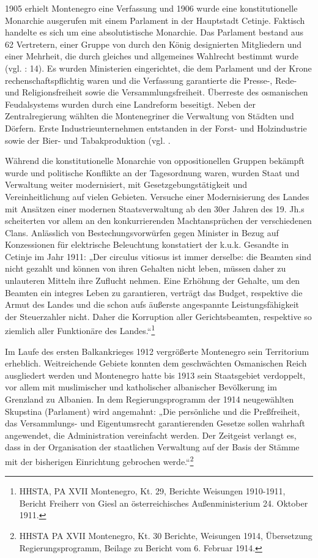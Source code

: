 1905 erhielt Montenegro eine Verfassung und 1906 wurde eine konstitutionelle Monarchie ausgerufen mit einem Parlament in der Hauptstadt Cetinje. Faktisch handelte es sich um eine absolutistische Monarchie. Das Parlament bestand aus 62 Vertretern, einer Gruppe von durch den König designierten Mitgliedern und einer Mehrheit, die durch gleiches und allgemeines Wahlrecht bestimmt wurde (vgl. \cite{brepohl} : 14). Es wurden Ministerien eingerichtet, die dem Parlament und der Krone rechenschaftspflichtig waren und die Verfassung garantierte die Presse-, Rede- und Religionsfreiheit sowie die Versammlungsfreiheit. Überreste des osmanischen Feudalsystems wurden durch eine Landreform beseitigt. Neben der Zentralregierung wählten die Montenegriner die Verwaltung von Städten und Dörfern. Erste Industrieunternehmen entstanden in der Forst- und Holzindustrie sowie der Bier- und Tabakproduktion (vgl. \cite{beardradin}.\par
Während die konstitutionelle Monarchie von oppositionellen Gruppen bekämpft wurde und politische Konflikte an der Tagesordnung waren, wurden Staat und Verwaltung weiter modernisiert, mit Gesetzgebungstätigkeit und Vereinheitlichung auf vielen Gebieten. Versuche einer Modernisierung des Landes mit Ansätzen einer modernen Staatsverwaltung ab den 30er Jahren des 19. Jh.s scheiterten vor allem an den konkurrierenden Machtansprüchen der verschiedenen Clans. Anlässlich von Bestechungsvorwürfen gegen Minister in Bezug auf Konzessionen für elektrische Beleuchtung konstatiert der k.u.k. Gesandte in Cetinje im Jahr 1911: „Der circulus vitiosus ist immer derselbe: die Beamten sind nicht gezahlt und können von ihren Gehalten nicht leben, müssen daher zu unlauteren Mitteln ihre Zuflucht nehmen. Eine Erhöhung der Gehalte, um den Beamten ein integres Leben zu garantieren, verträgt das Budget, respektive die Armut des Landes und die schon aufs äußerste angespannte Leistungsfähigkeit der Steuerzahler nicht. Daher die Korruption aller Gerichtsbeamten, respektive so ziemlich aller Funktionäre des Landes.“\footnote{HHSTA, PA XVII Montenegro, Kt. 29, Berichte Weisungen 1910-1911, Bericht Freiherr von Giesl an österreichisches Außenministerium 24. Oktober 1911.}\par

Im Laufe des ersten Balkankrieges 1912 vergrößerte Montenegro sein Territorium erheblich. Weitreichende Gebiete konnten dem geschwächten Osmanischen Reich ausgliedert werden und Montenegro hatte bis 1913 sein Staatsgebiet verdoppelt, vor allem mit muslimischer und katholischer albanischer Bevölkerung im Grenzland zu Albanien. In dem Regierungsprogramm der 1914 neugewählten Skupstina (Parlament) wird angemahnt: „Die persönliche und die Preßfreiheit, das Versammlungs- und Eigentumsrecht garantierenden Gesetze sollen wahrhaft angewendet, die Administration vereinfacht werden. Der Zeitgeist verlangt es, dass in der Organisation der staatlichen Verwaltung auf der Basis der Stämme mit der bisherigen Einrichtung gebrochen werde.“\footnote{HHSTA PA XVII Montenegro, Kt. 30 Berichte, Weisungen 1914, Übersetzung Regierungsprogramm, Beilage zu Bericht vom 6. Februar 1914.}

